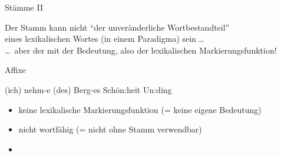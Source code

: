 \begin{frame}
  {Stämme II}
  \begin{exe}
    \ex
    \begin{xlist}
        \pause
        \pause
    \end{xlist}
  \end{exe}
  \pause
  \pause
  \pause
  \pause
  \pause
  Der \alert{Stamm} kann nicht "`der unveränderliche Wortbestandteil"'\\
  eines lexikalischen Wortes (in einem Paradigma) sein \ldots\\
  \Zeile
  \pause
  \alert{\dots\ aber der mit der Bedeutung, also der lexikalischen Markierungsfunktion}!
\end{frame}

\begin{frame}
  {Affixe}
  \pause
  \begin{exe}
    \ex
    \begin{xlist}
      \ex (ich) nehm\alert<6->{-e}
      \pause
      \ex (des) Berg\alert<7->{-es}
      \pause
      \ex Schön\alert<8->{:heit}
      \pause
      \ex \alert<9->{Un:}ding
    \end{xlist}
  \end{exe}
  \Zeile
  \pause
  \pause
  \pause
  \pause
  \pause
  \begin{itemize}[<+->]
    \item \alert{keine lexikalische Markierungsfunktion} (= keine eigene Bedeutung)
    \item \alert{nicht wortfähig} (= nicht ohne Stamm verwendbar)
      \Halbzeile
    \item {}
  \end{itemize}
\end{frame}



